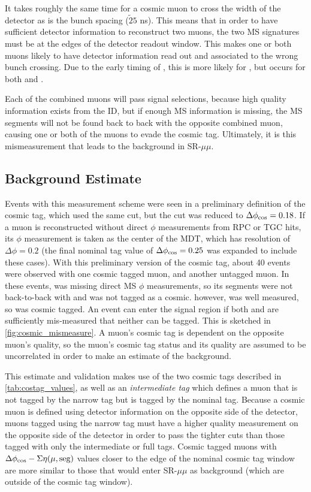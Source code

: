 It takes roughly the same time for a cosmic muon to cross the width of the detector as is the bunch spacing ($\tilde 25$ ns). This means that in order to have sufficient detector information to reconstruct two muons, the two \ac{MS} signatures must be at the edges of the detector readout window. This makes one or both muons likely to have detector information read out and associated to the wrong bunch crossing. Due to the early timing of \mt, this is more likely for \mt, but occurs for both \mt and \mb. 

Each of the combined muons will pass signal selections, because high quality information exists from the \ac{ID}, but if enough \ac{MS} information is missing, the \ac{MS} segments will not be found back to back with the opposite combined muon, causing one or both of the muons to evade the cosmic tag. Ultimately, it is this mismeasurement that leads to the background in SR-$\mu\mu$. 



\subsection{Background Estimate}

Events with this measurement scheme were seen in a preliminary definition of the cosmic tag, which used the same \sigeta cut, but the \dphicos cut was reduced to $\Delta \phi_{\text{cos}} = 0.18$. If a muon is reconstructed without direct $\phi$ measurements from \ac{RPC} or \ac{TGC} hits, its $\phi$ measurement is taken as the center of the \ac{MDT}, which has resolution of $\Delta \phi = 0.2$ (the final nominal tag value of $\Delta \phi_{\text{cos}} = 0.25$ was expanded to include these cases). With this preliminary version of the cosmic tag, about 40 events were observed with one cosmic tagged muon, and another untagged muon. In these events, \mt was missing direct \ac{MS} $\phi$ measurements, so its segments were not back-to-back with \mb and \mb was not tagged as a cosmic. \mb however, was well measured, so \mt was cosmic tagged. An event can enter the signal region if both \mb and \mt are sufficiently mis-measured that neither can be tagged. This is sketched in \autoref{fig:cosmic_mismeasure}. A muon's cosmic tag is dependent on the opposite muon's quality, so the muon's cosmic tag status and its quality are assumed to be uncorrelated in order to make an estimate of the background.

This estimate and validation makes use of the two cosmic tags described in \autoref{tab:costag_values}, as well as an \emph{intermediate tag} which defines a muon that is not tagged by the narrow tag but is tagged by the nominal tag. Because a cosmic muon is defined using detector information on the opposite side of the detector, muons tagged using the narrow tag must have a higher quality measurement on the opposite side of the detector in order to pass the tighter cuts than those tagged with only the intermediate or full tags. Cosmic tagged muons with $\Delta \phi_{\text{cos}}-\Sigma \eta(\mu, \text{seg})$ values closer to the edge of the nominal cosmic tag window are more similar to those that would enter SR-$\mu\mu$ as background (which are outside of the cosmic tag window). 



